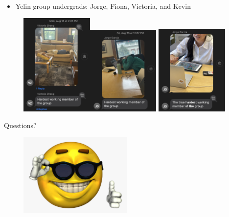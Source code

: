\documentclass[xcolor=dvipsnames]{beamer}
\begin{document}
\begin{frame}
  \begin{itemize}
    \item Yelin group undergrads: Jorge, Fiona, Victoria, and Kevin
  \end{itemize}
  \begin{figure}
    \centering
    \includegraphics[width=0.32\textwidth]{Jorge.png}\includegraphics[width=0.32\textwidth]{Fiona.png} \includegraphics[width=0.32\textwidth]{Victoria.png}
  \end{figure}
\end{frame}

\begin{frame}{Questions?}
  
  \begin{figure}
    \centering
    \includegraphics[width=0.5\textwidth]{thumbsup.png}
  \end{figure}

\end{frame}
\end{document}
